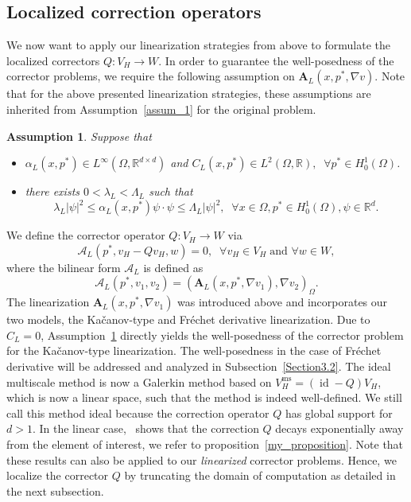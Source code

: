 \documentclass{article}
\newtheorem{assumption}{Assumption}
\begin{document}
\subsection{Localized correction operators}
We now want to apply our linearization strategies from above to formulate the localized correctors $Q: V_H\to W$. In order to guarantee the well-posedness of the corrector problems, we require the following assumption on $\mathbf{A}_L(x,p^*,\nabla v)$. Note that for the above presented linearization strategies, these assumptions are inherited from Assumption~\ref{assum_1} for the original problem.
\begin{assumption}\label{assump2} Suppose that 
     \begin{itemize}
     \item   $\alpha_L(x,p^*) \in L^\infty(\Omega,\mathbb{R}^{d\times d})$ and $C_L(x,p^*) \in L^2(\Omega,\mathbb{R}), \; \; \forall p^* \in  H^1_0(\Omega)$.
     \item there exists $0<\lambda_L<\Lambda_L$ such that 
                        \[\lambda_L |\psi|^2\leq \alpha_L(x,p^*)\psi\cdot \psi \leq \Lambda_L|\psi|^2 ,\; \;\forall x \in \Omega , p^* \in H_0^1(\Omega), \psi \in \mathbb{R}^d.\]
 \end{itemize}
 \end{assumption}
 We define the corrector operator $Q: V_H\xrightarrow{}W$ via 
\begin{equation}\label{LinearOrthogonality}
    \mathcal{A}_L( p^*, v_H-Qv_H,w)=0, \; \;\forall v_H \in V_H \;\text{and }\forall w \in W,
\end{equation}
where the bilinear form $\mathcal{A}_L$ is defined as
    \[\mathcal{A}_L(p^*,v_1,v_2)=(\mathbf{A}_L(x,p^*,\nabla v_1),\nabla v_2)_\Omega.\]
The linearization $\mathbf{A}_L(x,p^*,\nabla v_1)$ was introduced above and incorporates our two models, the Kačanov-type and Fr\'echet derivative linearization.
Due to $C_L=0$, Assumption~\ref{assump2} directly yields the well-posedness of the corrector problem for the Kačanov-type linearization. The well-posedness in the case of Fréchet derivative will be addressed and analyzed in Subsection~\ref{Section3.2}.
The ideal multiscale method is now a Galerkin method based on $V_H^\mathrm{ms}=(\operatorname{id}-Q)V_H$, which is now a linear space, such that the method is indeed well-defined.
We still call this method ideal because the correction operator $Q$ has global support for $d>1$. In the linear case,~\cite{LOD-Linear} shows that the correction $Q$ decays exponentially away from the element of interest, we refer to proposition~\ref{my_proposition}. Note that these results can also be applied to our \emph{linearized} corrector problems. Hence, we localize the corrector $Q$ by truncating the domain of computation as detailed in the next subsection. 
\end{document}
